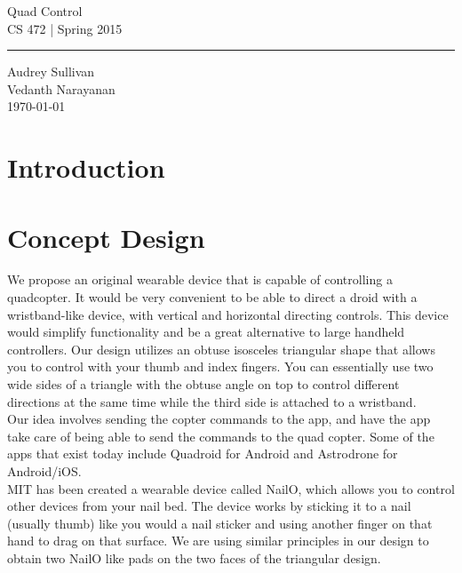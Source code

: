 \documentclass[12pt,letterpaper]{article}
\begin{document}
\begin{titlepage}
    \vspace*{4cm}
    \begin{flushright}
    {\huge
        Quad Control\\[5mm]
    }
    {\large
        CS 472 | Spring 2015
     }
    \end{flushright}
\hrule
    \begin{flushright}
	Audrey Sullivan\\
	Vedanth Narayanan\\
    \vfill
	\today\\
    \end{flushright}
\end{titlepage}

\raggedright

\section*{Introduction}

\section*{Concept Design}
We propose an original wearable device that is capable of controlling a quadcopter. It would be very convenient to be able to direct a droid with a wristband-like device, with vertical and horizontal directing controls. This device would simplify functionality and be a great alternative to large handheld controllers.
Our design utilizes an obtuse isosceles triangular shape that allows you to control with your thumb and index fingers. You can essentially use two wide sides of a triangle with the obtuse angle on top to control different directions at the same time while the third side is attached to a wristband. \\
Our idea involves sending the copter commands to the app, and have the app take care of being able to send the commands to the quad copter. Some of the apps that exist today include Quadroid for Android and Astrodrone for Android/iOS. \\
MIT has been created a wearable device called NailO, which allows you to control other devices from your nail bed. The device works by sticking it to a nail (usually thumb) like you would a nail sticker and using another finger on that hand to drag on that surface. We are using similar principles in our design to obtain two NailO like pads on the two faces of the triangular design. \\
\end{document}
